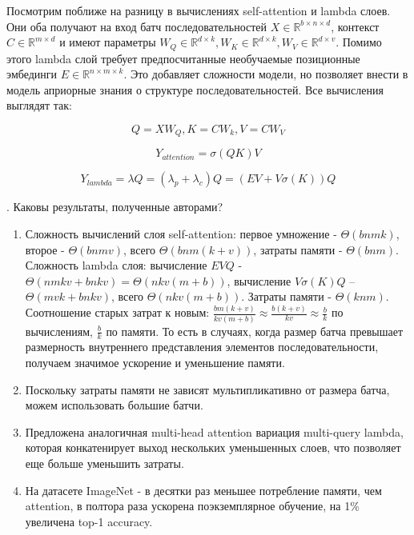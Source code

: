 \documentclass[10pt]{article}
\begin{document}
	\medskip
	Посмотрим поближе на разницу в вычислениях self-attention и lambda слоев. Они оба получают на вход батч последовательностей $X \in \mathbb{R}^{b \times n \times d}$, контекст $C \in \mathbb{R}^{m \times d}$ и имеют параметры 
	$W_Q \in \mathbb{R}^{d \times k}, W_K \in \mathbb{R}^{d \times k}, W_V \in \mathbb{R}^{d \times v}$. Помимо этого lambda слой требует предпосчитанные необучаемые позиционные эмбединги $E \in \mathbb{R}^{n \times m \times k}$. Это добавляет сложности модели, но позволяет внести в модель априорные знания о структуре последовательностей. Все вычисления выглядят так:
	
	$$Q = XW_Q, K = CW_k, V = CW_V$$
	
	$$Y_{attention} = \sigma(QK)V$$
	
	$$ Y_{lambda} = \lambda Q  = (\lambda_p + \lambda_c)Q = (EV + V\sigma(K))Q$$
	
	. Каковы результаты, полученные авторами?
	\medskip
	
	\begin{enumerate}
		\item Сложность вычислений слоя self-attention: первое умножение - $\Theta(bnmk) $, второе - $\Theta(bnmv)$, всего $\Theta(bnm(k + v))$, затраты памяти - $\Theta(bnm)$. Сложность lambda слоя: вычисление $EVQ$ - $\Theta(nmkv + bnkv)=\Theta(nkv(m + b))$, вычисление $V\sigma(K)Q $ -- $ \Theta(mvk + bnkv)$, всего $\Theta(nkv(m + b))$. Затраты памяти - $\Theta(knm)$. Соотношение старых затрат к новым: $\frac{bm(k+v)}{kv(m+b)} \approx \frac{b(k+v)}{kv} \approx \frac{b}{k}$ по вычислениям, $\frac{b}{k}$ по памяти. То есть в случаях, когда размер батча превышает размерность внутреннего представления элементов последовательности, получаем значимое ускорение и уменьшение памяти.
		\item Поскольку затраты памяти не зависят мультипликативно от размера батча, можем использовать большие батчи.
		\item Предложена аналогичная multi-head attention вариация multi-query lambda, которая конкатенирует выход нескольких уменьшенных слоев, что позволяет еще больше уменьшить затраты.
		\item На датасете ImageNet - в десятки раз меньшее потребление памяти, чем attention, в полтора раза ускорена поэкземплярное обучение, на 1\% увеличена top-1 accuracy.
	\end{enumerate}
	
	\bigskip
	
	
\end{document}
